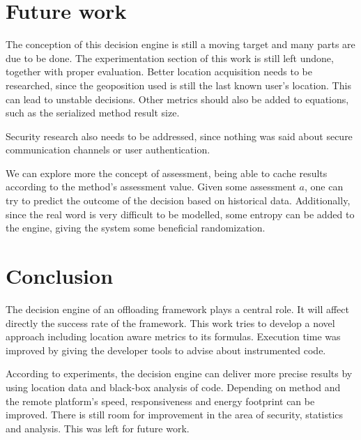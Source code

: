 \documentclass[10pt, conference, letterpaper]{IEEEtran}
\begin{document}
  \section{Future work} \label{sec:futurework}

  The conception of this decision engine is still a moving target and many parts are due to be done. The experimentation section of this work is still left undone, together with proper evaluation. Better location acquisition needs to be researched, since the geoposition used is still the last known user's location. This can lead to unstable decisions. Other metrics should also be added to equations, such as the serialized method result size.

  Security research also needs to be addressed, since nothing was said about secure communication channels or user authentication.

  We can explore more the concept of assessment, being able to cache results according to the method's assessment value. Given some assessment $a$, one can try to predict the outcome of the decision based on historical data. Additionally, since the real word is very difficult to be modelled, some entropy can be added to the engine, giving the system some beneficial randomization.  

  \section{Conclusion}

  The decision engine of an offloading framework plays a central role. It will affect directly the success rate of the framework. This work tries to develop a novel approach including location aware metrics to its formulas. Execution time was improved by giving the developer tools to advise about instrumented code.

  According to experiments, the decision engine can deliver more precise results by using location data and black-box analysis of code. Depending on method and the remote platform's speed, responsiveness and energy footprint can be improved. There is still room for improvement in the area of security, statistics and analysis. This was left for future work.





\end{document}
